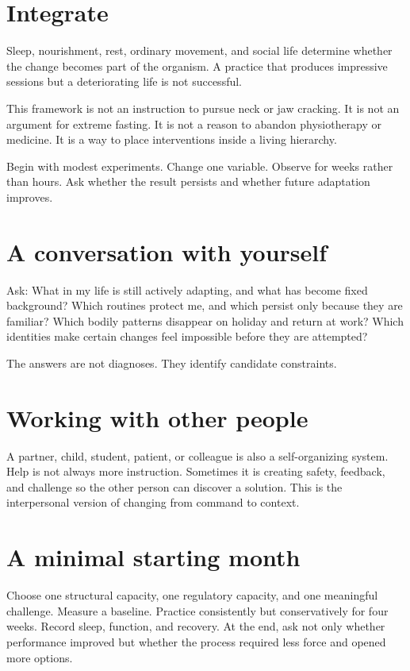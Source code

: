 \section{Integrate}\label{integrate}

Sleep, nourishment, rest, ordinary movement, and social life determine whether the change becomes part of the organism. A practice that produces impressive sessions but a deteriorating life is not successful.

This framework is not an instruction to pursue neck or jaw cracking. It is not an argument for extreme fasting. It is not a reason to abandon physiotherapy or medicine. It is a way to place interventions inside a living hierarchy.

Begin with modest experiments. Change one variable. Observe for weeks rather than hours. Ask whether the result persists and whether future adaptation improves.

\section{A conversation with yourself}\label{a-conversation-with-yourself}

Ask: What in my life is still actively adapting, and what has become fixed background? Which routines protect me, and which persist only because they are familiar? Which bodily patterns disappear on holiday and return at work? Which identities make certain changes feel impossible before they are attempted?

The answers are not diagnoses. They identify candidate constraints.

\section{Working with other people}\label{working-with-other-people}

A partner, child, student, patient, or colleague is also a self-organizing system. Help is not always more instruction. Sometimes it is creating safety, feedback, and challenge so the other person can discover a solution. This is the interpersonal version of changing from command to context.

\section{A minimal starting month}\label{a-minimal-starting-month}

Choose one structural capacity, one regulatory capacity, and one meaningful challenge. Measure a baseline. Practice consistently but conservatively for four weeks. Record sleep, function, and recovery. At the end, ask not only whether performance improved but whether the process required less force and opened more options.
